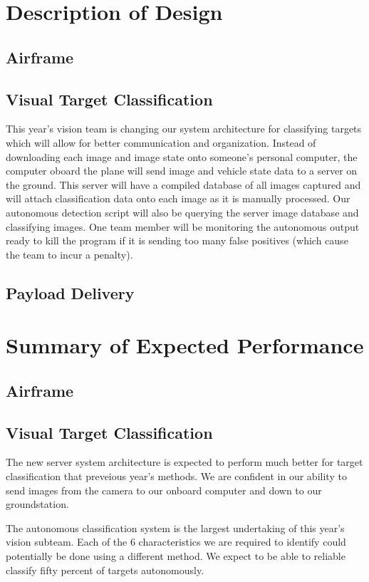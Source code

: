 \documentclass[]{auvsi_doc}
\begin{document}
\section{Description of Design}
\subsection{Airframe}
\subsection{Visual Target Classification}
This year's vision team is changing our system architecture for classifying targets which will
allow for better communication and organization. Instead of downloading each image and image state
onto someone's personal computer, the computer oboard the plane will send image and vehicle state
data to a server on the ground. This server will have a compiled database of all images captured
and will attach classification data onto each image as it is manually processed. Our
autonomous detection script will also be querying the server image database and classifying
images. One team member will be monitoring the autonomous output ready to kill the
program if it is sending too many false positives (which cause the team to incur a
penalty).
\subsection{Payload Delivery}
\section{Summary of Expected Performance}
\subsection{Airframe}
\subsection{Visual Target Classification}
The new server system architecture is expected to perform much better for target classification that preveious year's methods. We are
confident in our ability to send images from the camera to our onboard computer and down to our groundstation.

The autonomous classification system is the largest undertaking of this year's vision subteam. Each of the 6 characteristics we are
required to identify could potentially be done using a different method. We expect to be able to reliable classify fifty percent of
targets autonomously.
\end{document}
